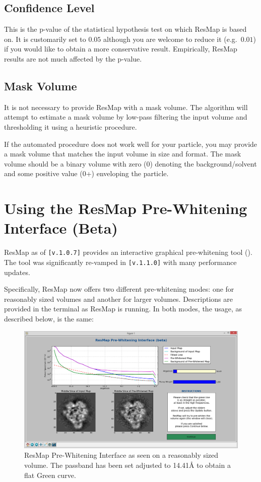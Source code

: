 \documentclass[10pt]{article}
\begin{document}
\subsection{Confidence Level}
This is the p-value of the statistical hypothesis test on which ResMap is based on. It is customarily set to $0.05$ although you are welcome to reduce it (e.g.~$0.01$) if you would like to obtain a more conservative result. Empirically, ResMap results are not much affected by the p-value.

\subsection{Mask Volume}
It is not necessary to provide ResMap with a mask volume. The algorithm will attempt to estimate a mask volume by low-pass filtering the input volume and thresholding it using a heuristic procedure. 

If the automated procedure does not work well for your particle, you may provide a mask volume that matches the input volume in size and format. The mask volume should be a binary volume with zero (0) denoting the background/solvent and some positive value (0+) enveloping the particle.

\section{Using the ResMap Pre-Whitening Interface (Beta)}
ResMap as of \texttt{[v.1.0.7]} provides an interactive graphical pre-whitening tool (). The tool was significantly re-vamped in \texttt{[v.1.1.0]} with many performance updates. 

Specifically, ResMap now offers two different pre-whitening modes: one for reasonably sized volumes and another for larger volumes. Descriptions are provided in the terminal as ResMap is running. In both modes, the usage, as described below, is the same:

\begin{figure}[!h]
\centering
\includegraphics[width=5in]{img/gui_preWhitening.png}
\caption{ResMap Pre-Whitening Interface as seen on a reasonably sized volume. The passband has been set adjusted to 14.41\AA{} to obtain a flat Green curve.}
\label{fig:prewhitening}
\end{figure}
\end{document}
